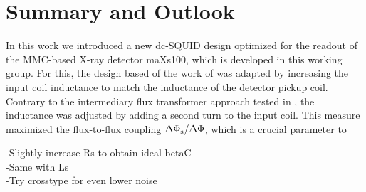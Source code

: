 \chapter{Summary and Outlook}

In this work we introduced a new dc-SQUID design optimized for the readout of the MMC-based X-ray detector maXs100, which is developed in this working group. For this, the design based of the work of \cite{Bauer2022} was adapted by increasing the input coil inductance to match the inductance of the detector pickup coil. Contrary to the intermediary flux transformer approach tested in \cite{Bauer2022}, the inductance was adjusted by adding a second turn to the input coil. This measure maximized the flux-to-flux coupling $\Delta\Phi_{\rm s}/\Delta\Phi$, which is a crucial parameter to   


-Slightly increase Rs to obtain ideal betaC \\
-Same with Ls \\
-Try crosstype for even lower noise